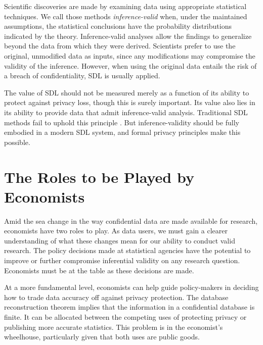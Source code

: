 Scientific discoveries are made by examining data using appropriate statistical techniques. We call those methods \emph{inference-valid} when, under the maintained assumptions, the statistical conclusions have the probability distributions indicated by the theory. Inference-valid analyses allow the findings to generalize beyond the data from which they were derived. Scientists prefer to use the original, unmodified data as inputs, since any modifications may compromise the validity of the inference. However, when using the original data entails the risk of a breach of confidentiality, \ac{SDL} is usually applied.

The value of \ac{SDL} should not be measured merely as a function of its ability to protect against privacy loss, though this is surely important. Its value also lies in its ability to provide data that admit inference-valid analysis. Traditional \ac{SDL} methods fail to uphold this principle \citep{abowd:schmutte:BPEA:2015}.
But inference-validity should be fully embodied in a modern \ac{SDL} system, and formal privacy principles make this possible.

\section{The Roles to be Played by Economists}

Amid the sea change in the way confidential data are made available for research, economists have two roles to play. As data users, we must gain a clearer understanding of what these changes mean for our ability to conduct valid research. The policy decisions made at statistical agencies have the potential to improve or further compromise inferential validity on any research question. Economists must be at the table as these decisions are made.

At a more fundamental level, economists can help guide policy-makers in deciding how to trade data accuracy off against privacy protection. The database reconstruction theorem implies that the information in a confidential database is finite. It can be allocated between the competing uses of protecting privacy or publishing more accurate statistics. This problem is in the economist's wheelhouse, particularly given that both uses are public goods.

